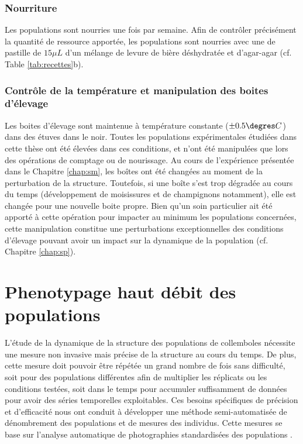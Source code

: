 \subsubsection{Nourriture}

Les populations sont nourries une fois par semaine. Afin de contrôler
précisément la quantité de ressource apportée, les populations sont nourries
avec une de pastille de $15\mu L$ d'un mélange de levure de bière déshydratée et
d'agar-agar (cf. Table \ref{tab:recettes}b).

\subsubsection{Contrôle de la température et manipulation des boites d'élevage}

Les boites d'élevage sont maintenue à température constante ($\pm 0.5\degres C$)
dans des étuves dans le noir. Toutes les populations expérimentales étudiées
dans cette thèse ont été élevées dans ces conditions, et n'ont été manipulées
que lors des opérations de comptage ou de nourissage. Au cours de l'expérience
présentée dans le Chapitre \ref{chap:sm}, les boîtes ont été changées au moment
de la perturbation de la structure. Toutefois, si une boîte s'est trop
dégradée au cours du temps (développement de moisissures et de
champignons notamment), elle est changée pour une nouvelle boite
propre. Bien qu'un soin particulier ait été apporté à cette opération pour
impacter au minimum les populations concernées, cette manipulation constitue une
 perturbations exceptionnelles des conditions d'élevage pouvant avoir un impact
 sur la dynamique de la population (cf. Chapitre \ref{chap:sp}).

\section{Phenotypage haut débit des populations}
\label{sec:bpsensor}

L'étude de la dynamique de la structure des populations de collemboles nécessite
une mesure non invasive mais précise de la structure au cours du temps. De plus,
cette mesure doit pouvoir être répétée un grand nombre de fois sans difficulté,
soit pour des populations différentes afin de multiplier les réplicats ou les
conditions testées, soit dans le temps pour accumuler suffisamment de données
pour avoir des séries temporelles exploitables. Ces besoins spécifiques de
précision et d'efficacité nous ont conduit à développer une méthode
semi-automatisée de dénombrement des populations et de mesures des individus.
Cette mesures se base sur l'analyse automatique de photographies standardisées
des populations \autocites[Figure
\ref{fig:photocount}, ][]{mallard2012a,mallard2013a}.

